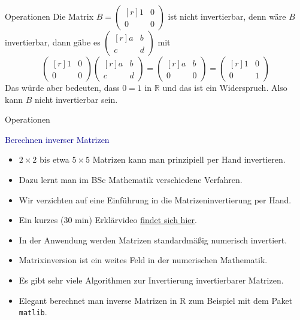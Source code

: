 \documentclass[
  8pt,
  ignorenonframetext,
]{beamer}
\providecommand{\tightlist}{%
  \setlength{\itemsep}{0pt}\setlength{\parskip}{0pt}}
\begin{document}
\begin{frame}{Operationen}
Die Matrix \(B = \begin{pmatrix*}[r] 1 & 0 \\ 0 & 0 \end{pmatrix*}\) ist
nicht invertierbar, denn wäre \(B\) invertierbar, dann gäbe es
\(\begin{pmatrix*}[r] a & b \\ c & d \end{pmatrix*}\) mit
\begin{equation}
\begin{pmatrix*}[r] 1 & 0 \\ 0 & 0 \end{pmatrix*}
\begin{pmatrix*}[r] a & b \\ c & d \end{pmatrix*}
=
\begin{pmatrix*}[r] a & b \\ 0 & 0 \end{pmatrix*}
=
\begin{pmatrix*}[r] 1 & 0 \\ 0 & 1 \end{pmatrix*}
\end{equation} Das würde aber bedeuten, dass \(0 = 1\) in \(\mathbb{R}\)
und das ist ein Widerspruch. Also kann \(B\) nicht invertierbar sein.
\end{frame}

\begin{frame}[fragile]{Operationen}
\protect\hypertarget{operationen-25}{}

\textcolor{darkblue}{Berechnen inverser Matrizen}

\small

\begin{itemize}
\tightlist
\item
  \(2 \times 2\) bis etwa \(5 \times 5\) Matrizen kann man prinzipiell
  per Hand invertieren.
\item
  Dazu lernt man im BSc Mathematik verschiedene Verfahren.
\item
  Wir verzichten auf eine Einführung in die Matrizeninvertierung per
  Hand.
\item
  Ein kurzes (30 min) Erklärvideo
  \href{https://www.youtube.com/watch?v=9TD6gXfQDkw\&t=7s}{findet sich
  hier}.
\item
  In der Anwendung werden Matrizen standardmäßig numerisch invertiert.
\item
  Matrixinversion ist ein weites Feld in der numerischen Mathematik.
\item
  Es gibt sehr viele Algorithmen zur Invertierung invertierbarer
  Matrizen.
\item
  Elegant berechnet man inverse Matrizen in R zum Beispiel mit dem Paket
  \texttt{matlib}.
\end{itemize}
\end{frame}
\end{document}
